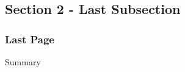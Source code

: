 \documentclass{beamer}
\begin{document}
\subsection[]{Section 2 - Last Subsection}

\begin{frame}\frametitle{Last Page}
	\begin{block}{Summary}
	\end{block}
\end{frame}
\end{document}
